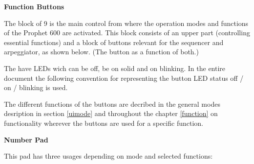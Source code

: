 \documentclass[landscape, 11pt, oneside]{report}
\newenvironment{flowtext}{\addmargin[0cm]{7cm}}{\endaddmargin} %
\begin{document}
\begin{flowtext}
\textbf{Function Buttons}

The block of 9 \funcbuttons is the main control from where the operation modes and functions of the Prophet 600 are activated. This block consists of an upper part (controlling essential functions) and a block of buttons relevant for the sequencer and arpeggiator, as shown below. (The button \record as a function of both.)


The \funcbuttons have LEDs wich can be off, be on solid and on blinking. In the entire document the following convention for representing the button LED status off / on / blinking is used.


The different functions of the buttons are decribed in the general modes desription in section \ref{uimode} and throughout the chapter \ref{function} on functionality wherever the buttons are used for a specific function. 

\textbf{Number Pad}

This pad has three usages depending on mode and selected functions:


\end{flowtext}
\end{document}
